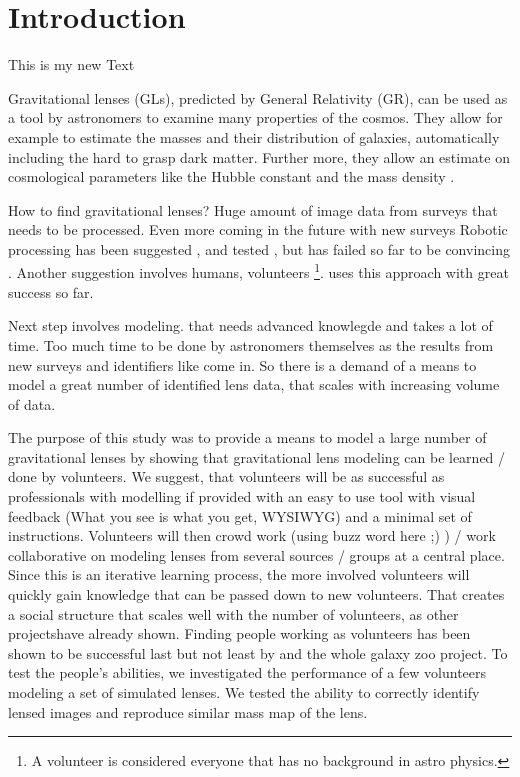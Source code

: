 \section{Introduction}

This is my new Text



Gravitational lenses (GLs), predicted by General Relativity (GR), can be used as a tool by astronomers to examine many properties of the cosmos.
They allow for example to estimate the masses and their distribution of galaxies, automatically including the hard to grasp dark matter.
Further more, they allow an estimate on cosmological parameters like the Hubble constant \citep{Saha2006} and the mass density \needcite.


How to find gravitational lenses? Huge amount of image data from surveys that needs to be processed.
Even more coming in the future with new surveys \needcite
Robotic processing has been suggested \needcite, and tested \needcite, but has failed so far to be convincing \needcite.
Another suggestion involves humans, volunteers \footnote{A volunteer is considered everyone that has no background in astro physics.}.
\sw uses this approach with great success so far.\needcite


Next step involves modeling. that needs advanced knowlegde and takes a lot of time.
Too much time to be done by astronomers themselves as the results from new surveys and identifiers like \sw come in.
So there is a demand of a means to model a great number of identified lens data, that scales with increasing volume of data.


The purpose of this study was to provide a means to model a large number of gravitational lenses by showing that gravitational lens modeling can be learned / done by volunteers.
We suggest, that volunteers will be as successful as professionals with modelling if provided with an easy to use tool with visual feedback (What you see is what you get, WYSIWYG) and a minimal set of instructions.
Volunteers will then crowd work (using buzz word here ;) ) / work collaborative on modeling lenses from several sources / groups at a central place.
Since this is an iterative learning process, the more involved volunteers will quickly gain knowledge that can be passed down to new volunteers.
That creates a social structure that scales well with the number of volunteers, as other projects\needcite have already shown.
Finding people working as volunteers has been shown to be successful last but not least by \sw and the whole galaxy zoo project.
To test the people's abilities, we investigated the performance of a few volunteers modeling a set of simulated lenses.
We tested the ability to correctly identify lensed images and reproduce similar mass map of the lens.
